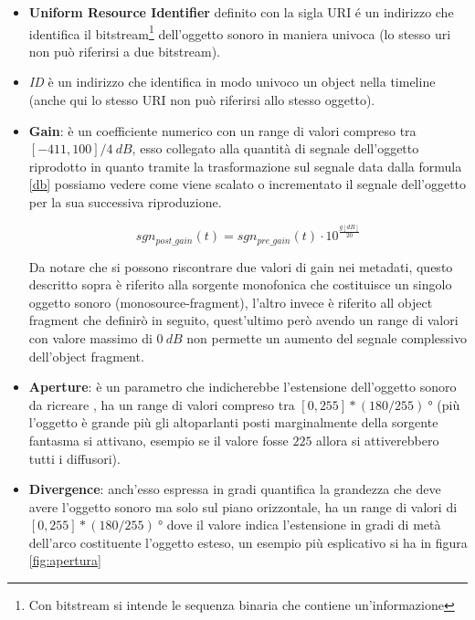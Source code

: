 \documentclass[12pt,a4paper]{report}
\begin{document}
\begin{itemize}
\item \textbf{Uniform Resource Identifier}\cite{uri} definito con la sigla URI é un indirizzo che identifica il bitstream\footnote{Con bitstream si intende le sequenza binaria che contiene un'informazione} dell'oggetto sonoro in maniera univoca (lo stesso uri non può riferirsi a due bitstream).

\item \textit{ID} è un indirizzo che identifica in modo univoco un object nella timeline (anche qui lo stesso URI non può riferirsi allo stesso oggetto).

\item \textbf{Gain}: è un coefficiente numerico con un range di valori compreso tra $[-411,100]/4 \ dB$, esso  collegato alla quantità di segnale dell'oggetto riprodotto in quanto tramite la trasformazione sul segnale data dalla formula \ref{db} possiamo vedere come viene scalato o incrementato il segnale dell'oggetto per la sua successiva riproduzione.

\begin{equation}
sgn_{post\_gain}(t)= sgn_{pre\_gain}(t) \cdot 10^{\frac{g[dB]}{20}}
\label{db}
\end{equation}

Da notare che si possono riscontrare due valori di gain nei metadati, questo descritto sopra è riferito alla sorgente monofonica che costituisce un singolo oggetto sonoro (monosource-fragment), l'altro invece è riferito all object fragment che definirò in seguito, quest'ultimo però avendo un range di valori con valore massimo di $0\ dB$ non permette un aumento del segnale complessivo dell'object fragment.
 
\item \textbf{Aperture}: è un parametro che indicherebbe l'estensione dell'oggetto sonoro da ricreare , ha un range di valori compreso tra $[0,255]*(180/255)\ °$ (più l'oggetto è grande più gli altoparlanti posti marginalmente della sorgente fantasma si attivano, esempio se il valore fosse $225$ allora si attiverebbero tutti i diffusori). 

\item \textbf{Divergence}: anch'esso espressa in gradi quantifica la grandezza che deve avere l'oggetto sonoro ma solo sul piano orizzontale, ha un range di valori di $[0,255]*(180/255)\ °$ dove il valore indica l'estensione in gradi di metà dell'arco costituente l'oggetto esteso, un esempio più esplicativo si ha in figura \ref{fig:apertura}


\end{itemize}
\end{document}
